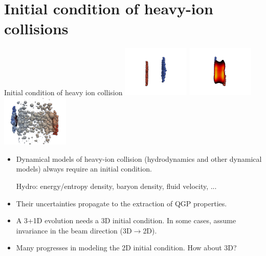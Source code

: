 \documentclass[11pt]{beamer}
\begin{document}
\section{Initial condition of heavy-ion collisions}
\begin{frame}{Initial condition of heavy ion collision}
\includegraphics[width=0.24\textwidth]{new1.png}
\includegraphics[width=0.24\textwidth]{new100.png}
\includegraphics[width=0.24\textwidth]{new300.png}
\begin{itemize}
\item Dynamical models of heavy-ion collision (hydrodynamics and other dynamical models) always require an initial condition.\\
\begin{center}
Hydro: energy/entropy density, baryon density, fluid velocity, ...
\end{center}
\item Their uncertainties propagate to the extraction of QGP properties.
\item A 3+1D evolution needs a 3D initial condition. In some cases, assume invariance in the beam direction (3D$\rightarrow$2D).
\item Many progresses in modeling the 2D initial condition. How about 3D?

\end{itemize}
\end{frame}
\end{document}

